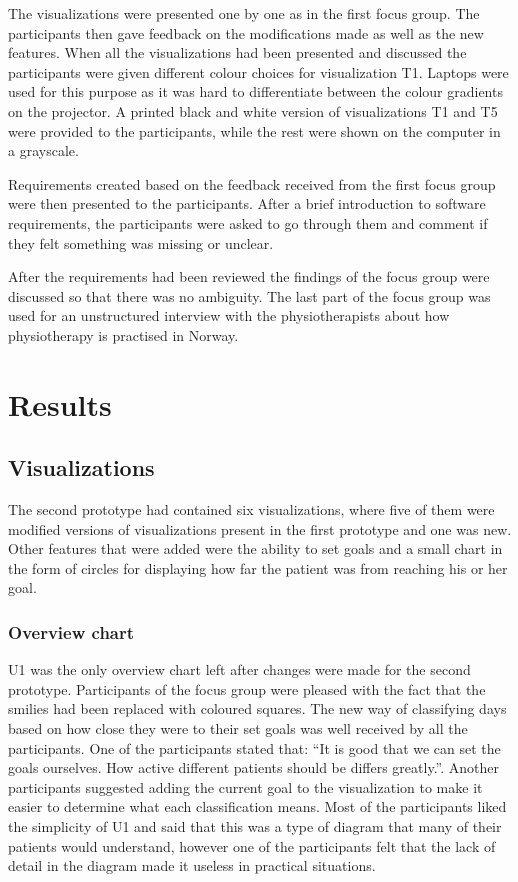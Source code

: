 The visualizations were presented one by one as in the first focus group. The participants then gave feedback on the modifications made as well as the new features. When all the visualizations had been presented and discussed the participants were given different colour choices for visualization T1. Laptops were used for this purpose as it was hard to differentiate between the colour gradients on the projector. A printed black and white version of visualizations T1 and T5 were provided to the participants, while the rest were shown on the computer in a grayscale.

Requirements created based on the feedback received from the first focus group were then presented to the participants. After a brief introduction to software requirements, the participants were asked to go through them and comment if they felt something was missing or unclear.

After the requirements had been reviewed the findings of the focus group were discussed so that there was no ambiguity. The last part of the focus group was used for an unstructured interview with the physiotherapists about how physiotherapy is practised in Norway. 

\section{Results}

\subsection{Visualizations}
The second prototype had contained six visualizations, where five of them were modified versions of visualizations present in the first prototype and one was new. Other features that were added were the ability to set goals and a small chart in the form of circles for displaying how far the patient was from reaching his or her goal.

\subsubsection{Overview chart}
U1 was the only overview chart left after changes were made for the second prototype. Participants of the focus group were pleased with the fact that the smilies had been replaced with coloured squares. The new way of classifying days based on how close they were to their set goals was well received by all the participants. One of the participants stated that: ``It is good that we can set the goals ourselves. How active different patients should be differs greatly.''. Another participants suggested adding the current goal to the visualization to make it easier to determine what each classification means. Most of the participants liked the simplicity of U1 and said that this was a type of diagram that many of their patients would understand, however one of the participants felt that the lack of detail in the diagram made it useless in practical situations.

